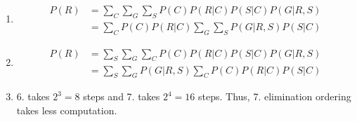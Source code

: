\documentclass[submit]{harvardml}
\begin{document}
\begin{enumerate}
    \item
    \begin{align}
        P(R) &= \sum_C \sum_G \sum_S P(C) P(R | C) P(S | C) P(G | R,S) \\
        &= \sum_C P(C) P(R | C) \sum_G \sum_S P(G | R, S) P(S | C)
    \end{align}
    
    \item
    \begin{align}
        P(R) &= \sum_S \sum_G \sum_C P(C) P(R | C) P(S | C) P(G | R,S) \\
        &= \sum_S \sum_G P(G | R,S) \sum_C P(C) P(R | C) P(S | C)
    \end{align}
    
    \item 6. takes $2^3 = 8$ steps and 7. takes $2^4 = 16$ steps. Thus, 7. elimination ordering takes less computation.

\end{enumerate}
\end{document}
